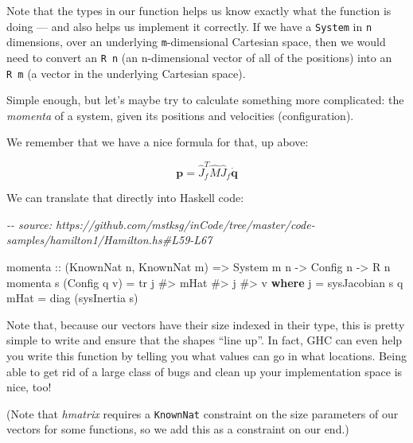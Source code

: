 \documentclass[]{article}
\newenvironment{Shaded}{}{}
\newcommand{\CommentTok}[1]{\textcolor[rgb]{0.38,0.63,0.69}{\textit{#1}}}
\newcommand{\DataTypeTok}[1]{\textcolor[rgb]{0.56,0.13,0.00}{#1}}
\newcommand{\KeywordTok}[1]{\textcolor[rgb]{0.00,0.44,0.13}{\textbf{#1}}}
\newcommand{\NormalTok}[1]{#1}
\newcommand{\OperatorTok}[1]{\textcolor[rgb]{0.40,0.40,0.40}{#1}}
\newcommand{\OtherTok}[1]{\textcolor[rgb]{0.00,0.44,0.13}{#1}}
\begin{document}
Note that the types in our function helps us know exactly what the function is
doing --- and also helps us implement it correctly. If we have a \texttt{System}
in \texttt{n} dimensions, over an underlying \texttt{m}-dimensional Cartesian
space, then we would need to convert an \texttt{R\ n} (an n-dimensional vector
of all of the positions) into an \texttt{R\ m} (a vector in the underlying
Cartesian space).

Simple enough, but let's maybe try to calculate something more complicated: the
\emph{momenta} of a system, given its positions and velocities (configuration).

We remember that we have a nice formula for that, up above:

\[
\mathbf{p} = \hat{J}_f^T \hat{M} \hat{J}_f \dot{\mathbf{q}}
\]

We can translate that directly into Haskell code:

\begin{Shaded}
\begin{Highlighting}[]
\CommentTok{{-}{-} source: https://github.com/mstksg/inCode/tree/master/code{-}samples/hamilton1/Hamilton.hs\#L59{-}L67}

\NormalTok{momenta}
\OtherTok{    ::}\NormalTok{ (}\DataTypeTok{KnownNat}\NormalTok{ n, }\DataTypeTok{KnownNat}\NormalTok{ m)}
    \OtherTok{=\textgreater{}} \DataTypeTok{System}\NormalTok{ m n}
    \OtherTok{{-}\textgreater{}} \DataTypeTok{Config}\NormalTok{ n}
    \OtherTok{{-}\textgreater{}} \DataTypeTok{R}\NormalTok{ n}
\NormalTok{momenta s (}\DataTypeTok{Config}\NormalTok{ q v) }\OtherTok{=}\NormalTok{ tr j }\OperatorTok{\#\textgreater{}}\NormalTok{ mHat }\OperatorTok{\#\textgreater{}}\NormalTok{ j }\OperatorTok{\#\textgreater{}}\NormalTok{ v}
  \KeywordTok{where}
\NormalTok{    j    }\OtherTok{=}\NormalTok{ sysJacobian s q}
\NormalTok{    mHat }\OtherTok{=}\NormalTok{ diag (sysInertia s)}
\end{Highlighting}
\end{Shaded}

Note that, because our vectors have their size indexed in their type, this is
pretty simple to write and ensure that the shapes ``line up''. In fact, GHC can
even help you write this function by telling you what values can go in what
locations. Being able to get rid of a large class of bugs and clean up your
implementation space is nice, too!

(Note that \emph{hmatrix} requires a \texttt{KnownNat} constraint on the size
parameters of our vectors for some functions, so we add this as a constraint on
our end.)
\end{document}
